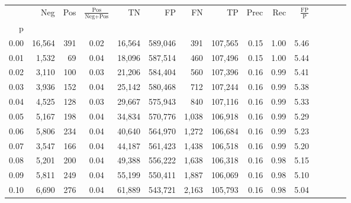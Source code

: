 \begin{tabular}{rrrcrrrrrrrrrrr}
\toprule
{} &     Neg &    Pos & $\frac{\text{Pos}}{\text{Neg}+\text{Pos}}$ &       TN &       FP &       FN &       TP &  Prec &   Rec & $\frac{\text{FP}}{\text{P}}$ \\
p    &         &        &                                            &          &          &          &          &       &       &                              \\
\midrule
0.00 &  16,564 &    391 &                                       0.02 &   16,564 &  589,046 &      391 &  107,565 &  0.15 &  1.00 &                         5.46 \\
0.01 &   1,532 &     69 &                                       0.04 &   18,096 &  587,514 &      460 &  107,496 &  0.15 &  1.00 &                         5.44 \\
0.02 &   3,110 &    100 &                                       0.03 &   21,206 &  584,404 &      560 &  107,396 &  0.16 &  0.99 &                         5.41 \\
0.03 &   3,936 &    152 &                                       0.04 &   25,142 &  580,468 &      712 &  107,244 &  0.16 &  0.99 &                         5.38 \\
0.04 &   4,525 &    128 &                                       0.03 &   29,667 &  575,943 &      840 &  107,116 &  0.16 &  0.99 &                         5.33 \\
0.05 &   5,167 &    198 &                                       0.04 &   34,834 &  570,776 &    1,038 &  106,918 &  0.16 &  0.99 &                         5.29 \\
0.06 &   5,806 &    234 &                                       0.04 &   40,640 &  564,970 &    1,272 &  106,684 &  0.16 &  0.99 &                         5.23 \\
0.07 &   3,547 &    166 &                                       0.04 &   44,187 &  561,423 &    1,438 &  106,518 &  0.16 &  0.99 &                         5.20 \\
0.08 &   5,201 &    200 &                                       0.04 &   49,388 &  556,222 &    1,638 &  106,318 &  0.16 &  0.98 &                         5.15 \\
0.09 &   5,811 &    249 &                                       0.04 &   55,199 &  550,411 &    1,887 &  106,069 &  0.16 &  0.98 &                         5.10 \\
0.10 &   6,690 &    276 &                                       0.04 &   61,889 &  543,721 &    2,163 &  105,793 &  0.16 &  0.98 &                         5.04 \\

\end{tabular}
